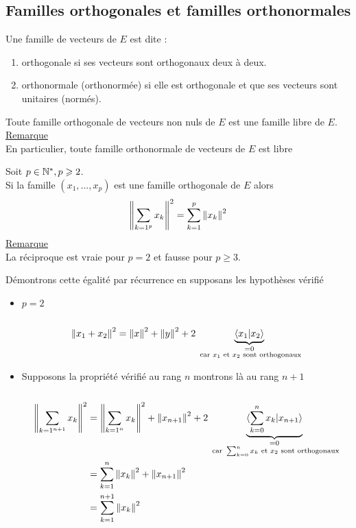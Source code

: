 \subsection{Familles orthogonales et familles orthonormales}
\begin{defi}
    Une famille de vecteurs de \(E\) est dite :
    \begin{enumerate}
        \item orthogonale si ses vecteurs sont orthogonaux deux à deux.
        \item orthonormale (orthonormée) si elle est orthogonale et que ses vecteurs sont unitaires (normés).
    \end{enumerate}
\end{defi}
\begin{defprop}
    Toute famille orthogonale de vecteurs non nuls de \(E\) est une famille libre de \(E\).\\
    \underline{Remarque}\\
    En particulier, toute famille orthonormale de vecteurs de \(E\) est libre
\end{defprop}
\begin{theo}
    Soit \(p \in \mathbb{N}^*, p \geqslant 2\).\\
    Si la famille \((x_1, \dots , x_p)\) est une famille orthogonale de \(E\) alors
    \[\left\|\sum_{k=1^p} x_k\right\|^2 = \sum_{k=1}^p\left\|x_k\right\|^2\]
    \underline{Remarque}\\
    La réciproque est vraie pour \(p = 2\) et fausse pour \(p \geq 3\).
\end{theo}
\begin{dem}
    Démontrons cette égalité par récurrence en supposans les hypothèses vérifié
    \begin{itemize}
        \item \(p = 2 \)\\~\\
        \[\left\|x_1 + x_2\right\|^2 = \left\|x\right\|^2 + \left\|y\right\|^2 + 2\underbrace{\langle x_1 | x_2 \rangle}_{ \substack{= 0\\ \text{ car } x_1 \text{ et } x_2 \text{ sont  orthogonaux}}}\]
        \item Supposons la propriété vérifié au rang \(n\) montrons là au rang \(n+1\)\\~\\
        \begin{align*}
            \left\|\sum_{k=1^{n+1}} x_k\right\|^2 &= \left\|\sum_{k=1^{n}} x_k\right\|^2 + \left\|x_{n+1}\right\|^2 + 2\underbrace{\langle \sum_{k=0}^n x_k | x_{n+1} \rangle}_{ \substack{= 0\\ \text{ car } \sum_{k=0}^n x_k \text{ et } x_2 \text{ sont orthogonaux}}} \\
            &=\sum_{k=1}^n\left\|x_k\right\|^2 + \left\|x_{n+1}\right\|^2\\
            &=\sum_{k=1}^{n+1}\left\|x_k\right\|^2
        \end{align*}
    \end{itemize}
\end{dem}
